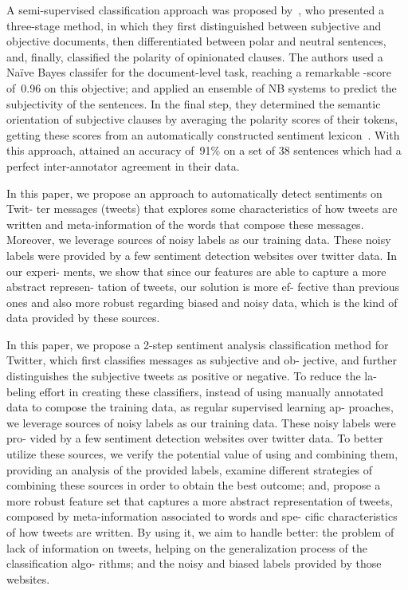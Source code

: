 A semi-supervised classification approach was proposed
by~\citet{Yu:03}, who presented a three-stage method, in which they
first distinguished between subjective and objective documents, then
differentiated between polar and neutral sentences, and, finally,
classified the polarity of opinionated clauses.  The authors used a
Na{\"i}ve Bayes classifer for the document-level task, reaching a
remarkable \F-score of~0.96 on this objective; and applied an ensemble
of NB systems to predict the subjectivity of the sentences.  In the
final step, they determined the semantic orientation of subjective
clauses by averaging the polarity scores of their tokens, getting
these scores from an automatically constructed sentiment
lexicon~\cite{Hatzivassi:97}.  With this approach, \citeauthor{Yu:03}
attained an accuracy of~91\% on a set of 38 sentences which had a
perfect inter-annotator agreement in their data.




In this paper, we propose an approach to automatically detect
sentiments on Twit- ter messages (tweets) that explores some
characteristics of how tweets are written and meta-information of the
words that compose these messages. Moreover, we leverage sources of
noisy labels as our training data. These noisy labels were provided by
a few sentiment detection websites over twitter data. In our experi-
ments, we show that since our features are able to capture a more
abstract represen- tation of tweets, our solution is more ef- fective
than previous ones and also more robust regarding biased and noisy
data, which is the kind of data provided by these sources.

In this paper, we propose a 2-step sentiment analysis classification
method for Twitter, which first classifies messages as subjective and
ob- jective, and further distinguishes the subjective tweets as
positive or negative. To reduce the la- beling effort in creating
these classifiers, instead of using manually annotated data to compose
the training data, as regular supervised learning ap- proaches, we
leverage sources of noisy labels as our training data. These noisy
labels were pro- vided by a few sentiment detection websites over
twitter data. To better utilize these sources, we verify the potential
value of using and combining them, providing an analysis of the
provided labels, examine different strategies of combining these
sources in order to obtain the best outcome; and, propose a more
robust feature set that captures a more abstract representation of
tweets, composed by meta-information associated to words and spe-
cific characteristics of how tweets are written. By using it, we aim
to handle better: the problem of lack of information on tweets,
helping on the generalization process of the classification algo-
rithms; and the noisy and biased labels provided by those websites.


